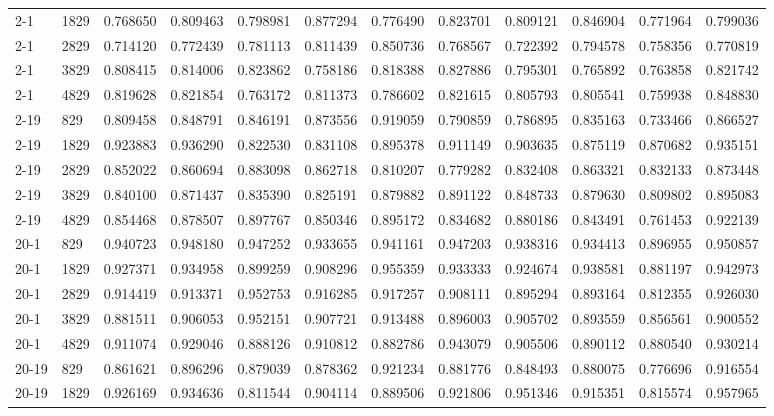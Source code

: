 \begin{longtable}{llrrrrrrrrrr}
2-1 & 1829 & 0.768650 & 0.809463 & 0.798981 & 0.877294 & 0.776490 & 0.823701 & 0.809121 & 0.846904 & 0.771964 & 0.799036\\
2-1 & 2829 & 0.714120 & 0.772439 & 0.781113 & 0.811439 & 0.850736 & 0.768567 & 0.722392 & 0.794578 & 0.758356 & 0.770819\\
2-1 & 3829 & 0.808415 & 0.814006 & 0.823862 & 0.758186 & 0.818388 & 0.827886 & 0.795301 & 0.765892 & 0.763858 & 0.821742\\
2-1 & 4829 & 0.819628 & 0.821854 & 0.763172 & 0.811373 & 0.786602 & 0.821615 & 0.805793 & 0.805541 & 0.759938 & 0.848830\\
2-19 & 829 & 0.809458 & 0.848791 & 0.846191 & 0.873556 & 0.919059 & 0.790859 & 0.786895 & 0.835163 & 0.733466 & 0.866527\\
2-19 & 1829 & 0.923883 & 0.936290 & 0.822530 & 0.831108 & 0.895378 & 0.911149 & 0.903635 & 0.875119 & 0.870682 & 0.935151\\
2-19 & 2829 & 0.852022 & 0.860694 & 0.883098 & 0.862718 & 0.810207 & 0.779282 & 0.832408 & 0.863321 & 0.832133 & 0.873448\\
2-19 & 3829 & 0.840100 & 0.871437 & 0.835390 & 0.825191 & 0.879882 & 0.891122 & 0.848733 & 0.879630 & 0.809802 & 0.895083\\
2-19 & 4829 & 0.854468 & 0.878507 & 0.897767 & 0.850346 & 0.895172 & 0.834682 & 0.880186 & 0.843491 & 0.761453 & 0.922139\\
20-1 & 829 & 0.940723 & 0.948180 & 0.947252 & 0.933655 & 0.941161 & 0.947203 & 0.938316 & 0.934413 & 0.896955 & 0.950857\\
20-1 & 1829 & 0.927371 & 0.934958 & 0.899259 & 0.908296 & 0.955359 & 0.933333 & 0.924674 & 0.938581 & 0.881197 & 0.942973\\
20-1 & 2829 & 0.914419 & 0.913371 & 0.952753 & 0.916285 & 0.917257 & 0.908111 & 0.895294 & 0.893164 & 0.812355 & 0.926030\\
20-1 & 3829 & 0.881511 & 0.906053 & 0.952151 & 0.907721 & 0.913488 & 0.896003 & 0.905702 & 0.893559 & 0.856561 & 0.900552\\
20-1 & 4829 & 0.911074 & 0.929046 & 0.888126 & 0.910812 & 0.882786 & 0.943079 & 0.905506 & 0.890112 & 0.880540 & 0.930214\\
20-19 & 829 & 0.861621 & 0.896296 & 0.879039 & 0.878362 & 0.921234 & 0.881776 & 0.848493 & 0.880075 & 0.776696 & 0.916554\\
20-19 & 1829 & 0.926169 & 0.934636 & 0.811544 & 0.904114 & 0.889506 & 0.921806 & 0.951346 & 0.915351 & 0.815574 & 0.957965\\

\end{longtable}
